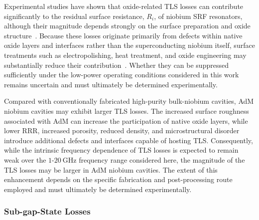 \documentclass[
  aps,
  physrev,
  reprint,
  superscriptaddress,
  nofootinbib,
  amsmath,
  amssymb
]{revtex4-2}
\begin{document}
Experimental studies have shown that oxide-related TLS losses can contribute significantly to the residual surface resistance, $R_i$, of niobium SRF resonators, although their magnitude depends strongly on the surface preparation and oxide structure~\cite{Romanenko2017,Bafia2024}. Because these losses originate primarily from defects within native oxide layers and interfaces rather than the superconducting niobium itself, surface treatments such as electropolishing, heat treatment, and oxide engineering may substantially reduce their contribution~\cite{Romanenko2017,Bafia2024}. Whether they can be suppressed sufficiently under the low-power operating conditions considered in this work remains uncertain and must ultimately be determined experimentally.


Compared with conventionally fabricated high-purity bulk-niobium cavities, AdM niobium cavities may exhibit larger TLS losses. The increased surface roughness associated with AdM can increase the participation of native oxide layers, while lower RRR, increased porosity, reduced density, and microstructural disorder introduce additional defects and interfaces capable of hosting TLS. Consequently, while the intrinsic frequency dependence of TLS losses is expected to remain weak over the $1$-$20~\mathrm{GHz}$ frequency range considered here, the magnitude of the TLS losses may be larger in AdM niobium cavities. The extent of this enhancement depends on the specific fabrication and post-processing route employed and must ultimately be determined experimentally.

\subsubsection[\appendixname~\thesubsubsection]{Sub-gap-State Losses}
\label{app:Rs_subgap}
\end{document}
